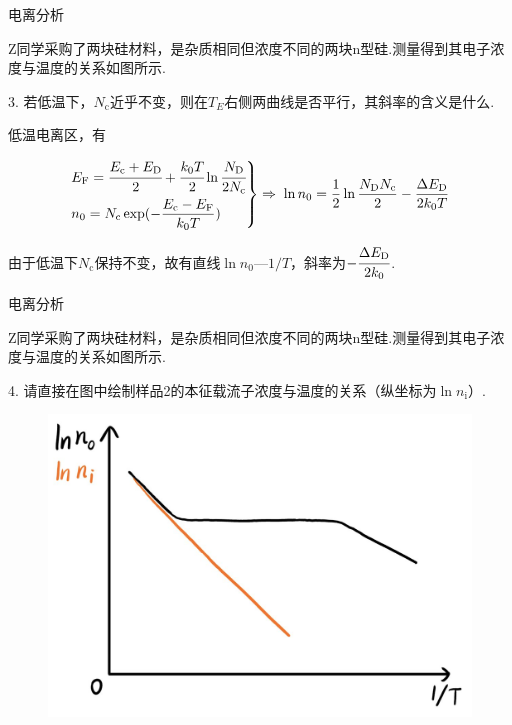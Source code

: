 \documentclass{beamer}
\begin{document}
\begin{frame}[t]{电离分析}

    {
    \kaishu
    \qquad Z同学采购了两块硅材料，是杂质相同但浓度不同的两块n型硅.测量得到其电子浓度与温度的关系如图所示.\par
    3. 若低温下，$N_{\text{c}}$近乎不变，则在$T_E$右侧两曲线是否平行，其斜率的含义是什么.
    } \par
    
    \vspace{0.1cm}    
    
    \qquad 低温电离区，有\par
    \vspace{-0.5cm}

    \begin{align*}
        \begin{rcases}
            E_{\text{F}} =\cfrac{E_{\text{c}}+E_{\text{D}}}{2}+\cfrac{k_{0} T}{2} \ln \cfrac{N_{\text{D}}}{2 N_{\text{c}}}  \\
             n_0 = N_\text{c} \exp (-\dfrac{E_{\text{c}}-E_{\text{F}}}{k_0 T})
        \end{rcases}
        \Rightarrow \; \ln n_0 =\frac{1}{2} \ln \frac{N_\text{D}N_\text{c}}{2} - \frac{\Delta E_\text{D}}{2 k_0 T}
    \end{align*}

    \vspace{-0.1cm}
    
    由于低温下$N_\text{c}$保持不变，故有直线$\ln n_0 — 1/T$，斜率为$- \cfrac{\Delta E_\text{D}}{2 k_0}$.
    
\end{frame}

\begin{frame}[t]{电离分析}

    {
    \kaishu
    \qquad Z同学采购了两块硅材料，是杂质相同但浓度不同的两块n型硅.测量得到其电子浓度与温度的关系如图所示.\par
    4. 请直接在图中绘制样品2的本征载流子浓度与温度的关系（纵坐标为$\ln n_{\text{i}}$）.
    } \par
    
    \begin{figure}[htbp]
        \centering
        \includegraphics[width=0.6\linewidth]{9.jpg}

    \end{figure}    
    
\end{frame}
\end{document}
